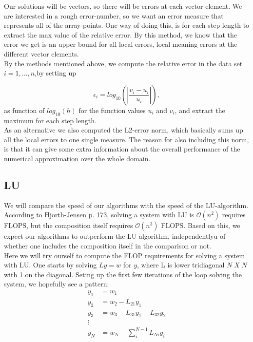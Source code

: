 \documentclass{article}
\begin{document}
Our solutions will be vectors, so there will be errors at each vector element. We are interested in a rough error-number, so we want an error measure that represents all of the array-points. One way of doing this, is for each step length to extract the max value of the relative error. By this method, we know that the error we get is an upper bound for all local errors, local meaning errors at the different vector elements.\\

By the methods mentioned above, we compute the relative error in the data set $i=1,\dots, n$,by setting up

\[
\epsilon_i=log_{10}\left(\left|\frac{v_i-u_i}
{u_i}\right|\right),
\]
as function of $log_{10}(h)$ for the function values $u_i$ and $v_i$, and extract the maximum for each step length.\\

As an alternative we also computed the L2-error norm, which basically sums up all the local errors to one single measure. The reason for also including this norm, is that it can give some extra information about the overall performance of the numerical approximation over the whole domain.

\subsection{LU}
We will compare the speed of our algorithms with the speed of the LU-algorithm. According to Hjorth-Jensen \cite{MHJ} p. 173, solving a system with LU is $\mathcal{O}(n^2)$ requires FLOPS, but the composition itself requires  $\mathcal{O}(n^3)$ FLOPS. Based on this, we expect our algorithms to outperform the LU-algorithm, independentlyu of whether one includes the composition itself in the comparison or not.\\

Here we will try ourself to compute the FLOP requirements for solving a system with LU. One starts by solving $Ly = w$ for $y$, where L is lower tridiagonal $N\; X\; N$ with 1 on the diagonal. Seting up the first few iterations of the loop solving the system, we hopefully see a pattern:
\begin{align}
y_1 &= w_1\\
y_2 &= w_2 - L_{21} y_1\\
y_3 &= w_3 - L_{31} y_1 - L_{32}y_2\\
\vdots\\
y_{N}& = w_N - \sum_{i}^{N-1} L_{Ni} y_i
\end{align}
\end{document}
